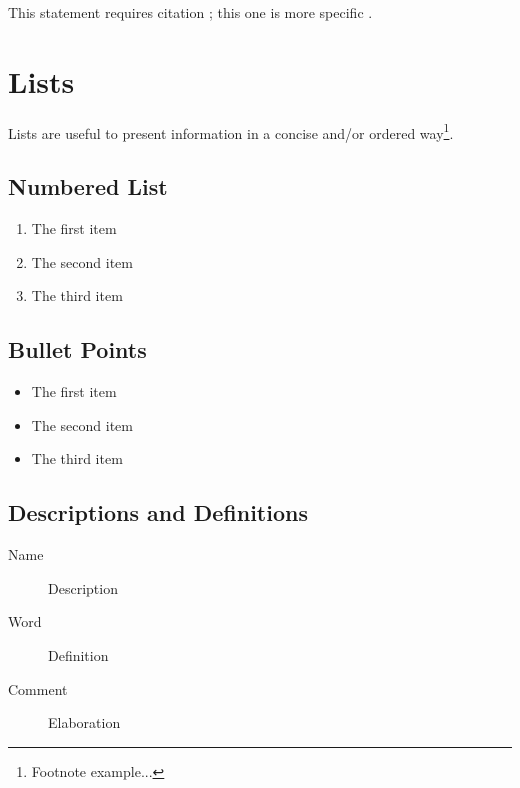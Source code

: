 \documentclass[11pt,fleqn]{book} %
\begin{document}
This statement requires citation \cite{article_key}; this one is more specific \cite[162]{book_key}.


\section{Lists}

Lists are useful to present information in a concise and/or ordered way\footnote{Footnote example...}.

\subsection{Numbered List}

\begin{enumerate}
    \item The first item
    \item The second item
    \item The third item
\end{enumerate}

\subsection{Bullet Points}

\begin{itemize}
    \item The first item
    \item The second item
    \item The third item
\end{itemize}

\subsection{Descriptions and Definitions}

\begin{description}
    \item[Name] Description
    \item[Word] Definition
    \item[Comment] Elaboration
\end{description}

\end{document}
